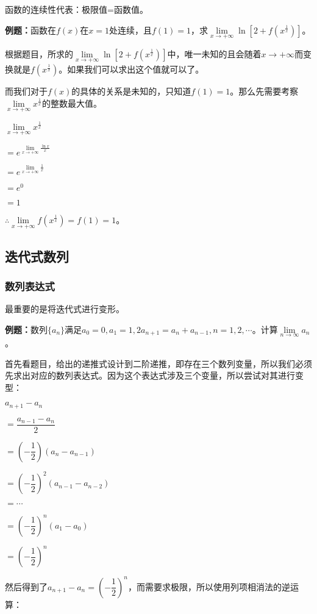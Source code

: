 \documentclass[UTF8, 12pt]{ctexart}
\begin{document}
函数的连续性代表：极限值=函数值。

\textbf{例题：}函数在$f(x)$在$x=1$处连续，且$f(1)=1$，求$\lim\limits_{x\to+\infty}\ln\left[2+f\left(x^{\frac{1}{x}}\right)\right]$。

根据题目，所求的$\lim\limits_{x\to+\infty}\ln\left[2+f\left(x^{\frac{1}{x}}\right)\right]$中，唯一未知的且会随着$x\to+\infty$而变换就是$f\left(x^{\frac{1}{x}}\right)$。如果我们可以求出这个值就可以了。

而我们对于$f(x)$的具体的关系是未知的，只知道$f(1)=1$。那么先需要考察$\lim\limits_{x\to+\infty}x^{\frac{1}{x}}$的整数最大值。

$\lim\limits_{x\to+\infty}x^{\frac{1}{x}}$

$=e^{\lim\limits_{x\to+\infty}\frac{\ln x}{x}}$

$=e^{\lim\limits_{x\to+\infty}\frac{1}{x}}$

$=e^0$

$=1$

$\therefore\lim\limits_{x\to+\infty}f(x^{\frac{1}{x}})=f(1)=1$。

\subsection{迭代式数列}

\subsubsection{数列表达式}

最重要的是将迭代式进行变形。

\textbf{例题：}数列$\{a_n\}$满足$a_0=0,a_1=1,2a_{n+1}=a_n+a_{n-1},n=1,2,\cdots$。计算$\lim\limits_{n\to\infty}a_n$。

首先看题目，给出的递推式设计到二阶递推，即存在三个数列变量，所以我们必须先求出对应的数列表达式。因为这个表达式涉及三个变量，所以尝试对其进行变型：

$a_{n+1}-a_n$

$=\dfrac{a_{n-1}-a_n}{2}$

$=\left(-\dfrac{1}{2}\right)(a_n-a_{n-1})$

$=\left(-\dfrac{1}{2}\right)^2(a_{n-1}-a_{n-2})$

$=\cdots$

$=\left(-\dfrac{1}{2}\right)^n(a_1-a_0)$

$= \left(-\dfrac{1}{2}\right)^n$

然后得到了$a_{n+1}-a_n=\left(-\dfrac{1}{2}\right)^n$，而需要求极限，所以使用列项相消法的逆运算：
\end{document}
